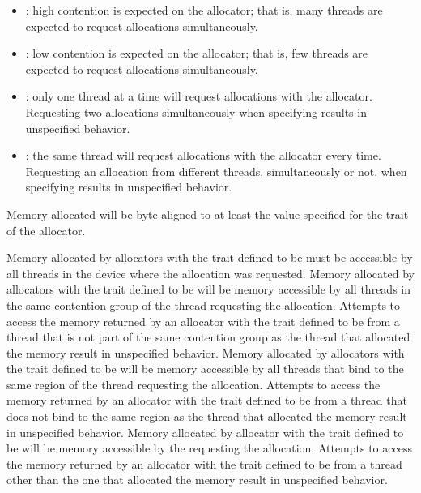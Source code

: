 \begin{itemize}
\item {}: high contention is expected on the allocator; that 
      is, many threads are expected to request allocations simultaneously.
\item {}: low contention is expected on the allocator; that 
      is, few threads are expected to request allocations simultaneously.
\item {}: only one thread at a time will request allocations 
      with the allocator. Requesting two allocations simultaneously when 
      specifying  results in unspecified behavior.
\item {}: the same thread will request allocations with the 
      allocator every time. Requesting an allocation from different threads, 
      simultaneously or not, when specifying  results in 
      unspecified behavior.
\end{itemize}

Memory allocated will be byte aligned to at least the value specified for the 
{} trait of the allocator.

Memory allocated by allocators with the  trait defined to be 
 must be accessible by all threads in the device where the allocation 
was requested. Memory allocated by allocators with the  trait 
defined to be  will be memory accessible by all threads in the 
same contention group of the thread requesting the allocation. Attempts to 
access the memory returned by an allocator with the  trait 
defined to be  from a thread that is not part of the same 
contention group as the thread that allocated the memory result in unspecified 
behavior. Memory allocated by allocators with the  trait defined 
to be  will be memory accessible by all threads that bind to the 
same {} region of the thread requesting the allocation. Attempts 
to access the memory returned by  an allocator with the  trait 
defined to be  from a thread that does not bind to the same 
{} region as the thread that allocated the memory result 
in unspecified behavior. Memory allocated by allocator with the  
trait defined to be  will be memory accessible by the {} 
requesting the allocation. Attempts to access the memory returned by an allocator 
with the  trait defined to be  from a thread other 
than the one that allocated the memory result in unspecified behavior.

